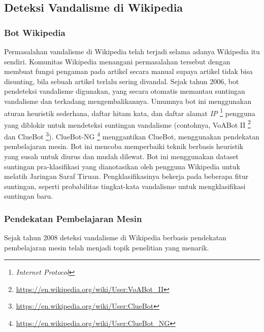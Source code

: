 \label{subsec:deteksi-vandalisme-di-wikipedia}
\subsection{Deteksi Vandalisme di Wikipedia}

\label{subsubsec:bot-wikipedia}
\subsubsection{Bot Wikipedia}

Permasalahan vandalisme di Wikipedia telah terjadi selama adanya Wikipedia itu sendiri.
Komunitas Wikipedia menangani permasalahan tersebut dengan membuat fungsi pengaman pada artikel secara manual supaya artikel tidak bisa disunting, bila sebuah artikel terlalu sering divandal.
Sejak tahun 2006, bot pendeteksi vandalisme digunakan, yang secara otomatis memantau suntingan vandalisme dan terkadang mengembalikannya.
Umumnya bot ini menggunakan aturan heuristik sederhana, daftar hitam kata, dan daftar alamat \textit{IP} \footnote{\textit{Internet Protocol}} pengguna yang diblokir untuk mendeteksi suntingan vandalisme (contohnya, VoABot II \footnote{\url{https://en.wikipedia.org/wiki/User:VoABot_II}} dan ClueBot \footnote{\url{https://en.wikipedia.org/wiki/User:ClueBot}}).
ClueBot-NG \footnote{\url{https://en.wikipedia.org/wiki/User:ClueBot_NG}} menggantikan ClueBot, menggunakan pendekatan pembelajaran mesin. Bot ini mencoba memperbaiki teknik berbasis heuristik yang susah untuk diurus dan mudah dilewat. Bot ini menggunakan dataset suntingan pra-klasifikasi yang dianotasikan oleh pengguna Wikipedia untuk melatih Jaringan Saraf Tiruan. Pengklasifikasinya bekerja pada beberapa fitur suntingan, seperti probabilitas tingkat-kata vandalisme untuk mengklasifikasi suntingan baru.

\label{subsubsec:pendekatan-pembelajaran-mesin}
\subsubsection{Pendekatan Pembelajaran Mesin}

Sejak tahun 2008 deteksi vandalisme di Wikipedia berbasis pendekatan pembelajaran mesin telah menjadi topik penelitian yang menarik.

